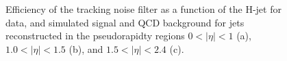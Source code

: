 \begin{figure}[!htb]
\centering
{}
\caption{Efficiency of the tracking noise filter as a function of the H-jet \pt for data, and simulated signal and QCD background
for jets reconstructed in the pseudorapidty regions $0 < |\eta| < 1$ (a), $1.0 < |\eta| < 1.5$ (b), and $1.5 < |\eta| < 2.4$ (c).}
\label{fig:eff-pt-filters-eta1}
\end{figure}

